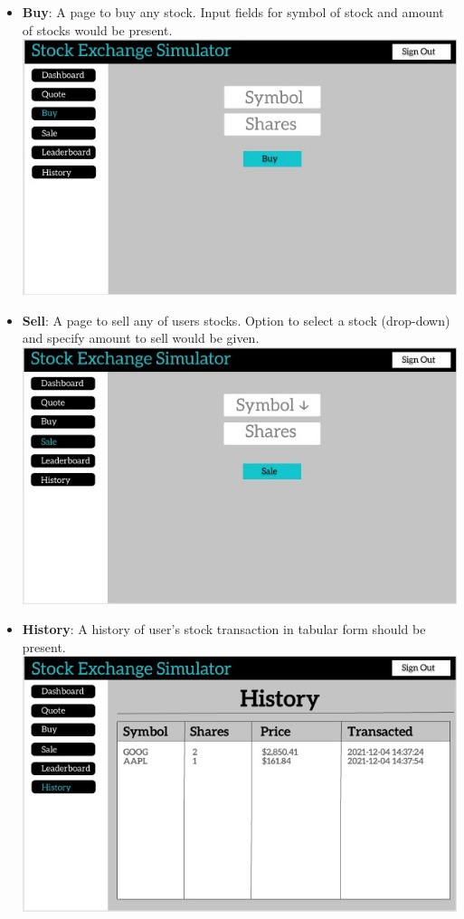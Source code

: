 \documentclass[12 pt, a4paper]{report}
\begin{document}
\begin{itemize}
		\item \textbf{Buy}: A page to buy any stock. Input fields for symbol of stock and amount of stocks would be present.\\
		\includegraphics[scale=0.5,keepaspectratio]{buy}
		\item \textbf{Sell}: A page to sell any of users stocks. Option to select a stock (drop-down) and specify amount to sell would be given.\\
		\includegraphics[scale=0.5,keepaspectratio]{sell}
		\item \textbf{History}: A history of user's stock transaction in tabular form should be present.\\
		\includegraphics[scale=0.5,keepaspectratio]{history}

\end{itemize}
\end{document}
